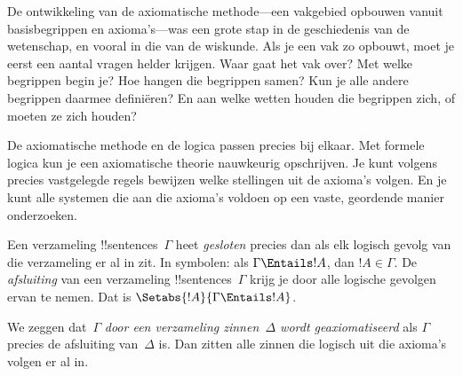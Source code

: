 \documentclass[../../../include/open-logic-section]{subfiles}
\begin{document}

\begin{explain}
De ontwikkeling van de axiomatische methode---een vakgebied opbouwen
vanuit basisbegrippen en axioma's---was een grote stap in de
geschiedenis van de wetenschap, en vooral in die van de wiskunde. Als
je een vak zo opbouwt, moet je eerst een aantal vragen helder krijgen.
Waar gaat het vak over? Met welke begrippen begin je? Hoe hangen die
begrippen samen? Kun je alle andere begrippen daarmee definiëren? En
aan welke wetten houden die begrippen zich, of moeten ze zich houden?

De axiomatische methode en de logica passen precies bij elkaar. Met
formele logica kun je een axiomatische theorie nauwkeurig opschrijven.
Je kunt volgens precies vastgelegde regels bewijzen welke stellingen
uit de axioma's volgen. En je kunt alle systemen die aan die axioma's
voldoen op een vaste, geordende manier onderzoeken.
\end{explain}

\begin{defn}
Een verzameling !!{sentence}s~$\Gamma$ heet \emph{gesloten} precies
dan als elk logisch gevolg van die verzameling er al in zit. In
symbolen: als $\Gamma \Entails !A$, dan $!A \in \Gamma$. De
\emph{afsluiting} van een verzameling !!{sentence}s~$\Gamma$ krijg je
door alle logische gevolgen ervan te nemen. Dat is
$\Setabs{!A}{\Gamma \Entails !A}$.

We zeggen dat~$\Gamma$ \emph{door een verzameling zinnen~$\Delta$
wordt geaxiomatiseerd} als $\Gamma$ precies de afsluiting van~$\Delta$
is. Dan zitten alle zinnen die logisch uit die axioma's volgen er al
in.
\end{defn}
\end{document}
